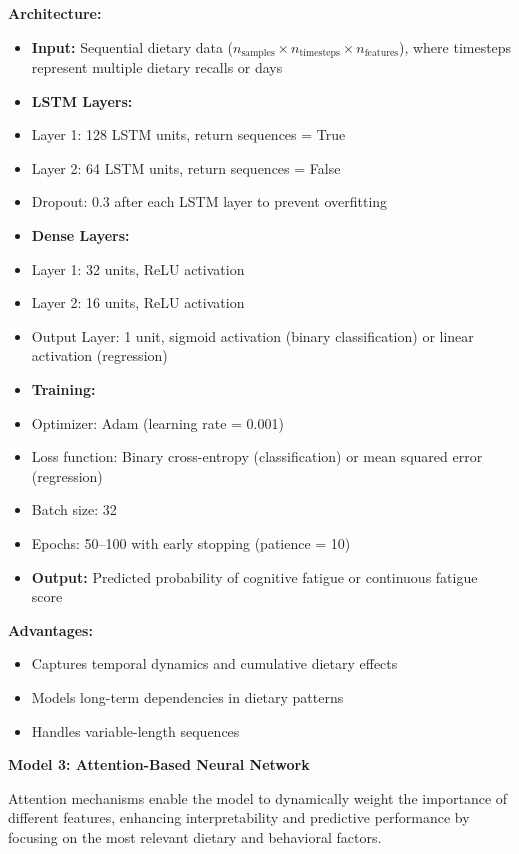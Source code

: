 \documentclass[journal,twoside,10pt]{IEEEtran}
\begin{document}
\textbf{Architecture:}
\begin{itemize}
\item \textbf{Input:} Sequential dietary data ($n_{\text{samples}} \times n_{\text{timesteps}} \times n_{\text{features}}$), where timesteps represent multiple dietary recalls or days
\item \textbf{LSTM Layers:}
\item Layer 1: 128 LSTM units, return sequences = True
\item Layer 2: 64 LSTM units, return sequences = False
\item Dropout: 0.3 after each LSTM layer to prevent overfitting
\item \textbf{Dense Layers:}
\item Layer 1: 32 units, ReLU activation
\item Layer 2: 16 units, ReLU activation
\item Output Layer: 1 unit, sigmoid activation (binary classification) or linear activation (regression)
\item \textbf{Training:}
\item Optimizer: Adam (learning rate = 0.001)
\item Loss function: Binary cross-entropy (classification) or mean squared error (regression)
\item Batch size: 32
\item Epochs: 50--100 with early stopping (patience = 10)
\item \textbf{Output:} Predicted probability of cognitive fatigue or continuous fatigue score
\end{itemize}

\textbf{Advantages:}
\begin{itemize}
\item Captures temporal dynamics and cumulative dietary effects
\item Models long-term dependencies in dietary patterns
\item Handles variable-length sequences
\end{itemize}

\textbf{Model 3: Attention-Based Neural Network}

Attention mechanisms enable the model to dynamically weight the importance of different features, enhancing interpretability and predictive performance by focusing on the most relevant dietary and behavioral factors.
\end{document}
